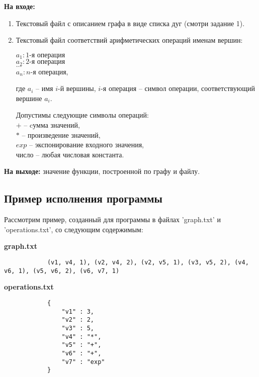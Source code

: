 \documentclass[bachelor, och, report]{../shiza}
\begin{document}
        \textbf{На входе:}
        \begin{enumerate}
            \item Текстовый файл с описанием графа в виде списка дуг (смотри задание 1).
            \item Текстовый файл соответствий арифметических операций именам вершин:
            
                \begin{center}
                    $a_1 : 1\text{-я операция}$ \\
                    $a_2 : 2\text{-я операция}$ \\
                    $\dots$ \\
                    $a_n : n\text{-я операция}$, \\
                \end{center}
                где $a_i$ -- имя $i$-й вершины, $i$-я операция -- символ операции, соответствующий вершине $a_i$.
                
                Допустимы следующие символы операций: \\
                $+$ -- cумма значений,\\
                $*$ -- произведение значений,\\
                $exp$ -- экспонирование входного значения,\\
                число -- любая числовая константа.\\		
        \end{enumerate}

        \textbf{На выходе:} значение функции, построенной по графу и файлу.
        

    \subsection{Пример исполнения программы}

        Рассмотрим пример, созданный для программы в файлах 'graph.txt' и
        'operations.txt', со следующим содержимым:

        \textbf{graph.txt}
        \begin{verbatim}
            (v1, v4, 1), (v2, v4, 2), (v2, v5, 1), (v3, v5, 2), (v4, v6, 1), (v5, v6, 2), (v6, v7, 1)
        \end{verbatim}

        \textbf{operations.txt}
        \begin{verbatim}
            {
                "v1" : 3,
                "v2" : 2,
                "v3" : 5,
                "v4" : "*",
                "v5" : "+",
                "v6" : "+",
                "v7" : "exp"
            }
        \end{verbatim}
        
\end{document}
